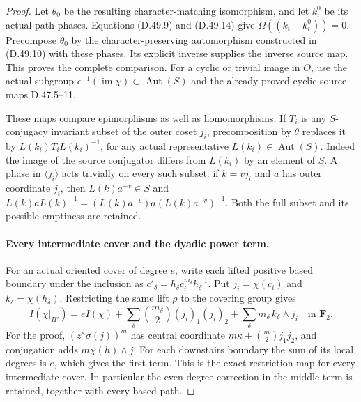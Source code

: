 \begin{proof}
Let \(\theta_0\) be the resulting character-matching isomorphism,
and let \(k_i^0\) be its actual path phases.
Equations \textup{(D.49.9)} and \textup{(D.49.14)} give
\(\Omega((k_i-k_i^0))=0\). Precompose \(\theta_0\) by the
character-preserving automorphism constructed in
\textup{(D.49.10)} with these phases. Its explicit inverse supplies
the inverse source map. This proves the complete comparison.
For a cyclic or trivial image in \(O\), use the actual subgroup
\(\epsilon^{-1}(\operatorname{im}\chi)\subset\operatorname{Aut}(S)\)
and the already proved cyclic source maps D.47.5--11.

These maps compare epimorphisms as well as homomorphisms.
If \(T_i\) is any \(S\)-conjugacy invariant subset of the outer coset
\(j_i\), precomposition by \(\theta\) replaces it by
\(L(k_i)T_iL(k_i)^{-1}\), for any actual representative
\(L(k_i)\in\operatorname{Aut}(S)\).
Indeed the image of the source conjugator differs from \(L(k_i)\)
by an element of \(S\). A phase in \(\langle j_i\rangle\) acts
trivially on every such subset: if \(k=vj_i\) and \(a\) has outer
coordinate \(j_i\), then \(L(k)a^{-v}\in S\) and
\(L(k)aL(k)^{-1}=(L(k)a^{-v})a(L(k)a^{-v})^{-1}\).
Both the full subset and its possible emptiness are retained.

\paragraph{Every intermediate cover and the dyadic power term.}
For an actual oriented cover of degree \(e\), write each lifted
positive based boundary under the inclusion as
\(c'_\delta=h_\delta c_i^{m_\delta}h_\delta^{-1}\).
Put \(j_i=\chi(c_i)\) and \(k_\delta=\chi(h_\delta)\).
Restricting the same lift \(\rho\) to the covering group gives
\[
 I(\chi|_{\Pi'})
 =eI(\chi)
  +\sum_\delta \binom{m_\delta}{2}(j_i)_1(j_i)_2
  +\sum_\delta m_\delta\,k_\delta\wedge j_i
                 \quad\text{in }\mathbf F_2.
 \tag{D.49.15}
\]
For the proof, \((z_0^\kappa\sigma(j))^m\) has central coordinate
\(m\kappa+\binom m2j_1j_2\), and conjugation adds
\(m\chi(h)\wedge j\). For each downstairs boundary the sum of
its local degrees is \(e\), which gives the first term.
This is the exact restriction map for every intermediate cover.
In particular the even-degree correction in the middle term is
retained, together with every based path.


\end{proof}
